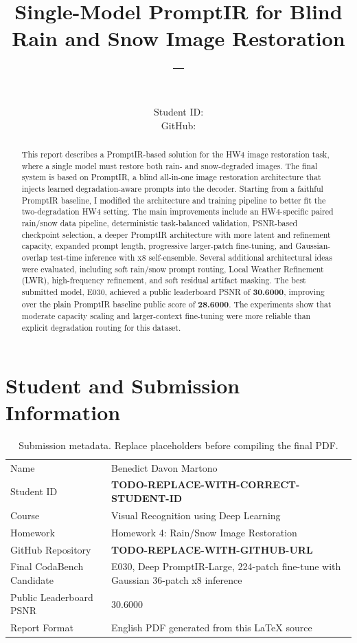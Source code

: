 \documentclass[10pt,conference]{article}
\title{\vspace{-1em}\textbf{Single-Model PromptIR for Blind Rain and Snow Image Restoration}\\
\large \CourseName{} -- \HomeworkName{}}
\author{\StudentName{}\\Student ID: \StudentID{}\\GitHub: \GithubURL{}}
\date{}
\newcommand{\StudentName}{Benedict Davon Martono}
\newcommand{\StudentID}{\textbf{TODO-REPLACE-WITH-CORRECT-STUDENT-ID}}
\newcommand{\CourseName}{Visual Recognition using Deep Learning}
\newcommand{\HomeworkName}{Homework 4: Rain/Snow Image Restoration}
\newcommand{\GithubURL}{\textbf{TODO-REPLACE-WITH-GITHUB-URL}}
\begin{document}
\maketitle

\begin{abstract}
This report describes a PromptIR-based solution for the HW4 image restoration task, where a single model must restore both rain- and snow-degraded images. The final system is based on PromptIR, a blind all-in-one image restoration architecture that injects learned degradation-aware prompts into the decoder. Starting from a faithful PromptIR baseline, I modified the architecture and training pipeline to better fit the two-degradation HW4 setting. The main improvements include an HW4-specific paired rain/snow data pipeline, deterministic task-balanced validation, PSNR-based checkpoint selection, a deeper PromptIR architecture with more latent and refinement capacity, expanded prompt length, progressive larger-patch fine-tuning, and Gaussian-overlap test-time inference with x8 self-ensemble. Several additional architectural ideas were evaluated, including soft rain/snow prompt routing, Local Weather Refinement (LWR), high-frequency refinement, and soft residual artifact masking. The best submitted model, E030, achieved a public leaderboard PSNR of \textbf{30.6000}, improving over the plain PromptIR baseline public score of \textbf{28.6000}. The experiments show that moderate capacity scaling and larger-context fine-tuning were more reliable than explicit degradation routing for this dataset.
\end{abstract}

\section{Student and Submission Information}

\begin{table}[H]
\centering
\caption{Submission metadata. Replace placeholders before compiling the final PDF.}
\begin{tabularx}{\linewidth}{lX}
\toprule
Name & \StudentName{} \\
Student ID & \StudentID{} \\
Course & \CourseName{} \\
Homework & \HomeworkName{} \\
GitHub Repository & \GithubURL{} \\
Final CodaBench Candidate & E030, Deep PromptIR-Large, 224-patch fine-tune with Gaussian 36-patch x8 inference \\
Public Leaderboard PSNR & 30.6000 \\
Report Format & English PDF generated from this \LaTeX{} source \\
\bottomrule
\end{tabularx}
\end{table}
\end{document}
